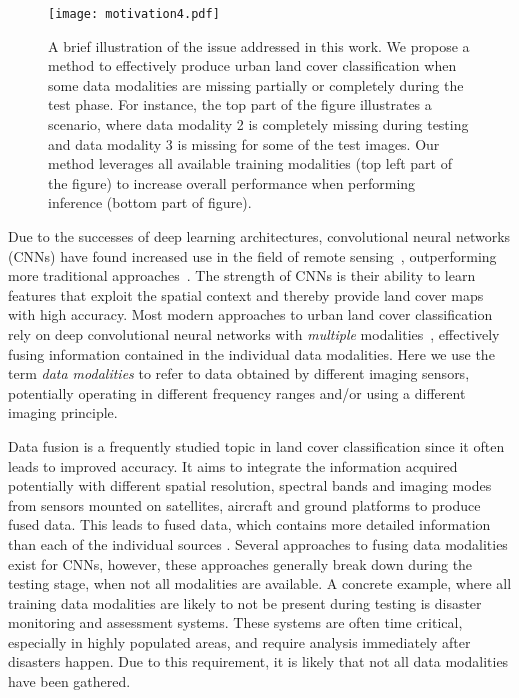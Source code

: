 \documentclass[journal]{IEEEtran}
\begin{document}
\begin{figure}[htb]
\centering
\texttt{[image: motivation4.pdf]}
\caption{A brief illustration of the issue addressed in this work. We propose a method to effectively produce urban land cover classification when some data modalities are missing partially or completely during the test phase. For instance, the top part of the figure illustrates a scenario, where data modality 2 is completely missing during testing and data modality 3 is missing for some of the test images. Our method leverages all available training modalities (top left part of the figure) to increase overall performance when performing inference (bottom part of figure).}
\label{fig:motivation}
\end{figure}

Due to the successes of deep learning architectures, convolutional neural networks (CNNs) have found increased use in the field of remote sensing~\cite{kampffmeyer2016semantic, maggiori2016fully, krylov2016large, volpi2017dense, audebert2017fusion}, outperforming more traditional approaches~\cite{lagrange2015benchmarking}.
The strength of CNNs is their ability to learn features that exploit the spatial context and thereby provide land cover maps with high accuracy. Most modern approaches to urban land cover classification rely on deep convolutional neural networks with \emph{multiple} modalities~\cite{kampffmeyer2016semantic, maggiori2016fully, krylov2016large, volpi2017dense, audebert2017fusion}, effectively fusing information contained in the individual data modalities. Here we use the term \emph{data modalities} to refer to data obtained by different imaging sensors, potentially operating in different frequency ranges and/or using a different imaging principle.

Data fusion is a frequently studied topic in land cover classification since it often leads to improved accuracy. It aims to integrate the information acquired potentially with different spatial resolution, spectral bands and imaging modes from sensors mounted on satellites, aircraft and ground platforms to produce fused data. This leads to fused data, which contains more detailed information than each of the individual sources \cite{zhang2010, bovolo2015}. Several approaches to fusing data modalities exist for CNNs, however, these approaches generally break down during the testing stage, when not all modalities are available. A concrete example, where all training data modalities are likely to not be present during testing is disaster monitoring and assessment systems. These systems are often time critical, especially in highly populated areas, and require analysis immediately after disasters happen. Due to this requirement, it is likely that not all data modalities have been gathered.
\end{document}
